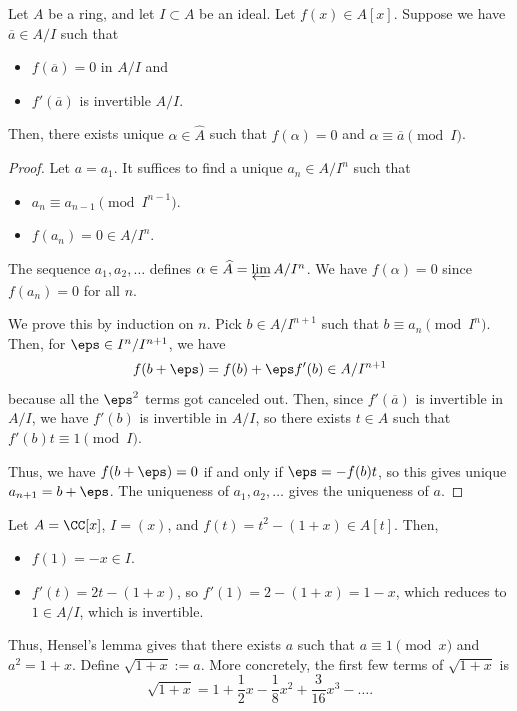 \begin{theorem}
    Let $A$ be a ring, and let $I\subset A$ be an ideal.
    Let $f(x)\in A[x]$.
    Suppose we have $\overline a\in A/I$ such that 
    \begin{itemize}
    \item $f(\overline a) = 0$ in $A/I$ and
    \item $f'(\overline a)$ is invertible $A/I$.
    \end{itemize}
    Then, there exists unique $\alpha\in\widehat A$
    such that $f(\alpha)=0$ and $\alpha\equiv \overline a\pmod I$.
\end{theorem}
\begin{proof}
    Let $a=a_1$.
    It suffices to find a unique
    $a_n\in A/I^n$ such that
    \begin{itemize}
	\item $a_n\equiv a_{n-1}\pmod{I^{n-1}}$.
    \item $f(a_n)=0\in A/I^n$.
    \end{itemize}
    The sequence $a_1,a_2,\dots$ defines $\alpha\in \widehat A
    = \varprojlim A/I^n$. We have $f(\alpha)=0$
    since $f(a_n)=0$ for all $n$.

    We prove this by induction on $n$.
    Pick $b\in A/I^{n+1}$ such that $b\equiv a_n\pmod{I^n}$.
    Then, for $\eps\in I^n/I^{n+1}$, we have
    $$f(b+\eps) = f(b) + \eps f'(b) \in A/I^{n+1}$$
    because all the $\eps^2$ terms got canceled out.
    Then, since $f'(\overline a)$ is invertible in $A/I$,
    we have $f'(b)$ is invertible in $A/I$, so
    there exists $t\in A$ such that $f'(b)t \equiv 1\pmod I$.

    Thus, we have $f(b+\eps)=0$ if and only if $\eps = -f(b)t$,
    so this gives unique $a_{n+1} = b+\eps$.
    The uniqueness of $a_1,a_2,\dots$ gives the uniqueness of $a$.
\end{proof}
\begin{example}
    Let $A = \CC[x]$, $I=(x)$,  and $f(t)=t^2-(1+x)\in A[t]$.
    Then,
    \begin{itemize}
    \item $f(1) = -x\in I$.
    \item $f'(t) = 2t-(1+x)$, so $f'(1) = 2-(1+x) = 1-x$,
    which reduces to $1\in A/I$, which is invertible.
    \end{itemize}
    Thus, Hensel's lemma gives that there exists
    $a$ such that $a\equiv 1\pmod x$ and $a^2=1+x$.
    Define $\sqrt{1+x} := a$.
    More concretely, the first few terms of $\sqrt{1+x}$ is
    $$\sqrt{1+x}=1+\frac 12 x - \frac 18 x^2 + \frac 3{16}x^3 - \dots.$$
\end{example}
